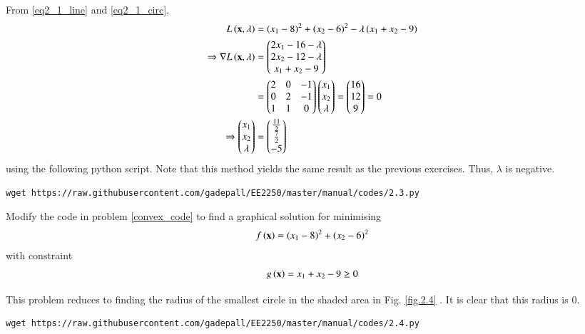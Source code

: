\documentclass[journal,12pt,twocolumn]{IEEEtran}
\begin{document}
\solution
From \eqref{eq2_1_line} and \eqref{eq2_1_circ}, 
%
\begin{align}
L\left(\mathbf{x},\lambda\right) &= (x_1-8)^2 + (x_2-6)^2 - \lambda \left(x_1 + x_2 - 9\right) \\
\Rightarrow \nabla L\left(\mathbf{x},\lambda\right)  & = 
\begin{pmatrix}
2x_1  - 16 - \lambda \\
2x_2 - 12 - \lambda \\
x_1 + x_2 -9
\end{pmatrix}
\\
&=
\begin{pmatrix}
2 &0 & - 1 \\
0 &2 & - 1 \\
1 & 1 & 0 
\end{pmatrix}
\begin{pmatrix}
x_1 \\
x_2 \\
\lambda
\end{pmatrix}
= 
\begin{pmatrix}
16 \\
 12 \\
9
\end{pmatrix}
=
0 
\\
\Rightarrow 
\begin{pmatrix}
x_1 \\
x_2 \\
\lambda
\end{pmatrix}
&= 
\begin{pmatrix}
\frac{11}{2} \\
 \frac{7}{2} \\
-5
\end{pmatrix}
\end{align}
%
using the following python script.  Note that this method yields the same result as the previous exercises.  Thus, $\lambda$ is negative.
%	
\begin{lstlisting}
wget https://raw.githubusercontent.com/gadepall/EE2250/master/manual/codes/2.3.py
\end{lstlisting}

%
\begin{problem}
\label{ch2_constraint}
Modify the code in problem \ref{convex_code} to find a graphical solution for minimising
\begin{align}
f\left(\mathbf{x}\right) = (x_1-8)^2 + (x_2-6)^2
\end{align}
with constraint
\begin{align}
g\left(\mathbf{x}\right) = x_1 + x_2 - 9 \geq 0
\end{align}
\end{problem}
\solution 
This problem reduces to finding the radius of the smallest circle in the shaded area in Fig. \ref{fig.2.4} .  It is clear that this radius is 0.
%	
\begin{lstlisting}
wget https://raw.githubusercontent.com/gadepall/EE2250/master/manual/codes/2.4.py
\end{lstlisting}
\end{document}
